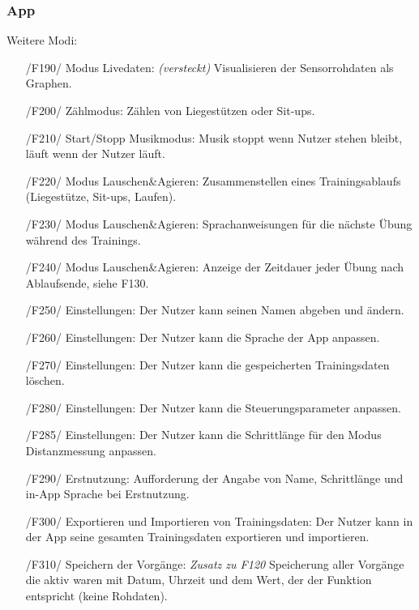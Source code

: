 \documentclass[a4paper,12pt]{article}
\begin{document}
    \subsubsection{App}
      Weitere Modi:
      \begin{itemize}
      \item[/F190/] \textsf{Modus Livedaten: \textit{(versteckt)}} Visualisieren der Sensorrohdaten als Graphen.
      \item[/F200/] \textsf{Zählmodus:} Zählen von Liegestützen oder Sit-ups. %
      \item[/F210/] \textsf{Start/Stopp Musikmodus:} Musik stoppt wenn Nutzer stehen bleibt, läuft wenn der Nutzer läuft.
      \item[/F220/] \textsf{Modus Lauschen\&Agieren:} Zusammenstellen eines Trainingsablaufs (Liegestütze, Sit-ups, Laufen). 
      \item[/F230/] \textsf {Modus Lauschen\&Agieren:} Sprachanweisungen für die nächste Übung während des Trainings.
      \item[/F240/] \textsf {Modus Lauschen\&Agieren:} Anzeige der Zeitdauer jeder Übung nach Ablaufsende, siehe F130.
      \item[/F250/] \textsf {Einstellungen:} Der Nutzer kann seinen Namen abgeben und ändern.
      \item[/F260/] \textsf {Einstellungen:} Der Nutzer kann die Sprache der App anpassen.
      \item[/F270/] \textsf {Einstellungen:} Der Nutzer kann die gespeicherten Trainingsdaten löschen.
      \item[/F280/] \textsf {Einstellungen:} Der Nutzer kann die Steuerungsparameter anpassen. %
      \item[/F285/] \textsf {Einstellungen:} Der Nutzer kann die Schrittlänge für den Modus Distanzmessung anpassen.%
      \item[/F290/] \textsf {Erstnutzung:} Aufforderung der Angabe von Name, Schrittlänge und in-App Sprache bei Erstnutzung.
      \item[/F300/] \textsf{Exportieren und Importieren von Trainingsdaten:} Der Nutzer kann in der App seine gesamten Trainingsdaten exportieren und importieren.
      \item[/F310/] \textsf{Speichern der Vorgänge: \textit{Zusatz zu F120}} Speicherung aller Vorgänge die aktiv waren mit Datum, Uhrzeit und dem Wert, der der Funktion entspricht (keine Rohdaten).   %
      \end{itemize}
\end{document}
